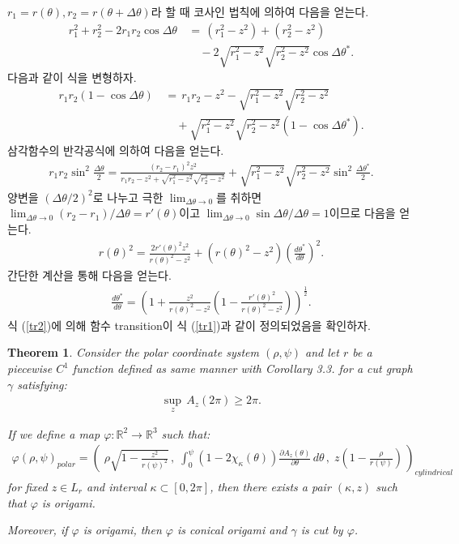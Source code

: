 \documentclass{amsart}
\theoremstyle{plain}
\newtheorem{theorem}{Theorem}[section]
\theoremstyle{definition}
\theoremstyle{remark}
\begin{document}
$r_1=r(\theta), r_2=r(\theta+\Delta\theta)$라 할 때 코사인 법칙에 의하여 다음을 얻는다.
\begin{align*}
r_1^2+r_2^2-2r_1r_2\cos\Delta\theta\,&=\,\left(r_1^2-z^2\right)+\left(r_2^2-z^2\right)
\\&\quad-2\sqrt{r_1^2-z^2}\sqrt{r_2^2-z^2}\cos\Delta\theta^*.
\end{align*}
다음과 같이 식을 변형하자.
\begin{align*}
r_1r_2(1-\cos\Delta\theta)\,&=\,r_1r_2-z^2-\sqrt{r_1^2-z^2}\sqrt{r_2^2-z^2}
\\&\quad+\sqrt{r_1^2-z^2}\sqrt{r_2^2-z^2}(1-\cos\Delta\theta^*).
\end{align*}
삼각함수의 반각공식에 의하여 다음을 얻는다.
\begin{align*}
r_1r_2\sin^2\frac{\Delta\theta}2=\frac{(r_2-r_1)^2z^2}{r_1r_2-z^2+\sqrt{r_1^2-z^2}\sqrt{r_2^2-z^2}}+\sqrt{r_1^2-z^2}\sqrt{r_2^2-z^2}\sin^2\frac{\Delta\theta^*}2.
\end{align*}
양변을 $(\Delta\theta/2)^2$로 나누고 극한 $\lim_{\Delta\theta\to0}$를 취하면 $\lim_{\Delta\theta\to0}(r_2-r_1)/\Delta\theta=r'(\theta)$이고 $\lim_{\Delta\theta\to0}\sin\Delta\theta/\Delta\theta=1$이므로 다음을 얻는다.
\begin{align*}
r(\theta)^2=\frac{2r'(\theta)^2z^2}{r(\theta)^2-z^2}+\left(r(\theta)^2-z^2\right)\left(\frac{d\theta^*}{d\theta}\right)^2.
\end{align*}
간단한 계산을 통해 다음을 얻는다.
\begin{align}\label{tr2}
\frac{d\theta^*}{d\theta}=\left(1+\frac{z^2}{r(\theta)^2 -z^2}\left(1-\frac{r'(\theta)^2}{r(\theta)^2 -z^2}\right)\right)^{\frac12}.
\end{align}
식 (\ref{tr2})에 의해 함수 transition이 식 (\ref{tr1})과 같이 정의되었음을 확인하자.
\fi




\begin{theorem}\label{4.1}%
Consider the polar coordinate system $(\rho, \psi)$ and let $r$ be a piecewise $C^1$ function defined as same manner with Corollary 3.3. for a cut graph $\gamma$ satisfying:
\begin{align}\label{condition}
\sup_z\,A_z(2\pi)\ge2\pi.
\end{align}

If we define a map $\varphi:{\mathbb R}^2\to{\mathbb R}^3$ such that:
\begin{align*}
\varphi(\rho,\psi)_{polar}=\left(\;\rho\sqrt{1-\frac{z^2}{r(\psi)^2}}\,,\;\int_0^{\psi}(1-2\chi_{\kappa}(\theta))\frac{\partial A_z(\theta)}{\partial\theta}\,d\theta\,,\;z\left(1-\frac{\rho}{r(\psi)}\right)\,\right)_{cylindrical}
\end{align*}
for fixed $z\in L_r$ and interval $\kappa\subset[0,2\pi]$, then there exists a pair $(\kappa,z)$ such that $\varphi$ is origami.

Moreover, if $\varphi$ is origami, then $\varphi$ is conical origami and $\gamma$ is cut by $\varphi$.
\end{theorem}
\end{document}
